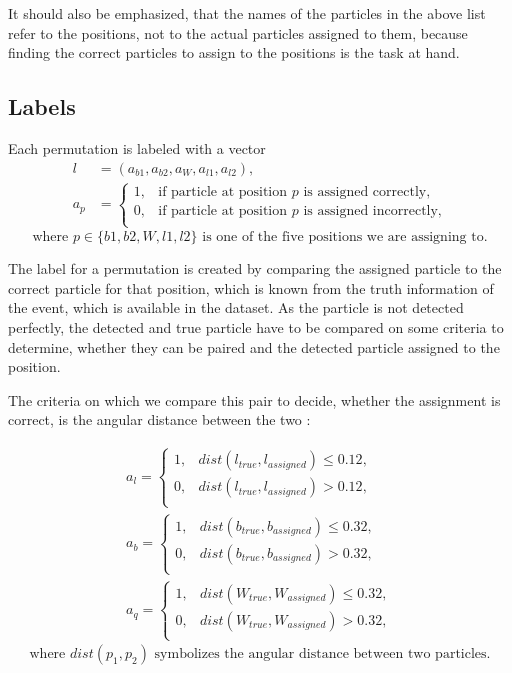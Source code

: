 \documentclass{ctuthesis}
\begin{document}
It should also be emphasized, that the names of the particles in the above list refer to the positions, not to the actual particles assigned to them, because finding the correct particles to assign to the positions is the task at hand.

\subsection{Labels}
Each permutation is labeled with a vector 
\begin{equation}
\begin{aligned}
l &= (a_{b1}, a_{b2}, a_{W}, a_{l1}, a_{l2}), \\
a_{p} &= \left\{
\begin{array}{ll}
      1, & \text{if particle at position $p$ is assigned correctly,}\\
      0, & \text{if particle at position $p$ is assigned incorrectly,}\\
\end{array} 
\right.
\end{aligned}
\label{labels_equation}
\end{equation}
$$\text{where } p \in \{b1, b2, W, l1, l2\} \text{ is one of the five positions we are assigning to.}$$

The label for a permutation is created by comparing the assigned particle to the correct particle for that position, which is known from the truth information of the event, which is available in the dataset. As the particle is not detected perfectly, the detected and true particle have to be compared on some criteria to determine, whether they can be paired and the detected particle assigned to the position.

The criteria on which we compare this pair to decide, whether the assignment is correct, is the angular distance between the two \cite[p.6]{parton_assignment}:

\begin{equation}
\begin{aligned}
a_{l}= \left\{
\begin{array}{ll}
      1, & dist(l_{true},l_{assigned}) \leq 0.12, \\
      0, & dist(l_{true},l_{assigned}) > 0.12, \\
\end{array} 
\right. \\
a_{b}= \left\{
\begin{array}{ll}
      1, & dist(b_{true},b_{assigned}) \leq 0.32, \\
      0, & dist(b_{true},b_{assigned}) > 0.32, \\
\end{array} 
\right. \\
a_{q}= \left\{
\begin{array}{ll}
      1, & dist(W_{true},W_{assigned}) \leq 0.32, \\
      0, & dist(W_{true},W_{assigned}) > 0.32, \\
\end{array} 
\right.
\end{aligned}
\end{equation}
$$\text{where }dist(p_1,p_2) \text{ symbolizes the angular distance between two particles.}$$
\end{document}

